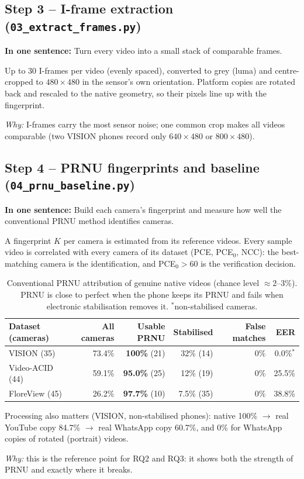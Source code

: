 \documentclass[11pt,a4paper]{article}
\newcommand{\say}[1]{\begin{onesentence}\small\textbf{In one sentence:} #1\end{onesentence}}
\newcommand{\why}[1]{\par\noindent\textit{Why:} #1\par}
\begin{document}
\subsection{Step 3 -- I-frame extraction (\texttt{03\_extract\_frames.py})}
\say{Turn every video into a small stack of comparable frames.}
Up to 30 I-frames per video (evenly spaced), converted to grey (luma) and centre-cropped to $480\times480$ in the sensor's own
orientation. Platform copies are rotated back and rescaled to the native geometry, so their pixels line up with the fingerprint.
\why{I-frames carry the most sensor noise; one common crop makes all videos comparable (two VISION phones record only
$640\times480$ or $800\times480$).}

\subsection{Step 4 -- PRNU fingerprints and baseline (\texttt{04\_prnu\_baseline.py})}
\say{Build each camera's fingerprint and measure how well the conventional PRNU method identifies cameras.}
A fingerprint $K$ per camera is estimated from its reference videos. Every sample video is correlated with every camera of its
dataset (PCE, PCE$_0$, NCC): the best-matching camera is the identification, and PCE$_0>60$ is the verification decision.

\begin{table}[H]\centering\small
\setlength{\tabcolsep}{5pt}\begin{tabular}{lrrrrr}\toprule
Dataset (cameras) & All cameras & Usable PRNU & Stabilised & False matches & EER \\\midrule
VISION (35) & 73.4\% & \textbf{100\%} (21) & 32\% (14) & 0\% & 0.0\%$^*$ \\
Video-ACID (44) & 59.1\% & \textbf{95.0\%} (25) & 12\% (19) & 0\% & 25.5\% \\
FloreView (45) & 26.2\% & \textbf{97.7\%} (10) & 7.5\% (35) & 0\% & 38.8\% \\\bottomrule
\end{tabular}\caption{Conventional PRNU attribution of genuine native videos (chance level $\approx$2--3\%). PRNU is close to
perfect when the phone keeps its PRNU and fails when electronic stabilisation removes it. $^*$non-stabilised cameras.}\label{tab:prnu}\end{table}

Processing also matters (VISION, non-stabilised phones): native 100\% $\rightarrow$ real YouTube copy 84.7\%
$\rightarrow$ real WhatsApp copy 60.7\%, and 0\% for WhatsApp copies of rotated (portrait) videos.
\why{this is the reference point for RQ2 and RQ3: it shows both the strength of PRNU and exactly where it breaks.}
\end{document}
